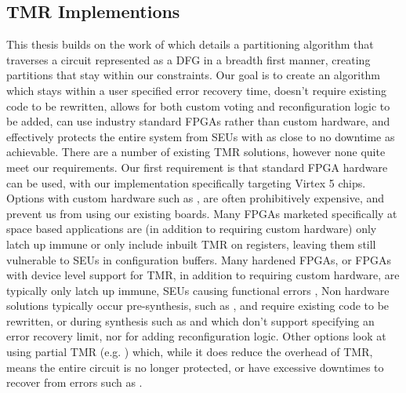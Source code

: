 \documentclass[12pt,drafta4paper,oneside]{memoir} %
\begin{document}
\subsection{\ac{TMR} Implementions}
This thesis builds on the work of\cite{DiesselChange} which details a partitioning algorithm that traverses a circuit represented as a \ac{DFG} in a breadth first manner, creating partitions that stay within our constraints.
Our goal is to create an algorithm which stays within a user specified error recovery time, doesn't require existing code to be rewritten, allows for both custom voting and reconfiguration logic to be added, can use industry standard \acp{FPGA} rather than custom hardware, and effectively protects the entire system from \acp{SEU} with as close to no downtime as achievable. There are a number of existing \ac{TMR} solutions, however none quite meet our requirements.
Our first requirement is that standard \ac{FPGA} hardware can be used, with our implementation specifically targeting Virtex 5 chips. Options with custom hardware such as \cite{VFPGATMR}, are often prohibitively expensive, and prevent us from using our existing boards.
Many \acp{FPGA} marketed specifically at space based applications are (in addition to requiring custom hardware) only latch up immune or only include inbuilt \ac{TMR} on registers, leaving them still vulnerable to \acp{SEU} in configuration buffers\cite{FPGAReview}.
Many hardened \acp{FPGA}, or \acp{FPGA} with device level support for \ac{TMR}, in addition to requiring custom hardware, are typically only latch up immune, \acp{SEU} causing functional errors \cite{FPGAReview},
Non hardware solutions typically occur pre-synthesis, such as \cite{ftmr}, and require existing code to be rewritten, or during synthesis such as \cite{synplify} and \cite{tmrtool} which don't support specifying an error recovery limit, nor for adding reconfiguration logic.
Other options look at using partial \ac{TMR} (e.g. \cite{partialTMR}) which, while it does reduce the overhead of \ac{TMR}, means the entire circuit is no longer protected, or have excessive downtimes to recover from errors such as \cite{VTMR}.
\end{document}
